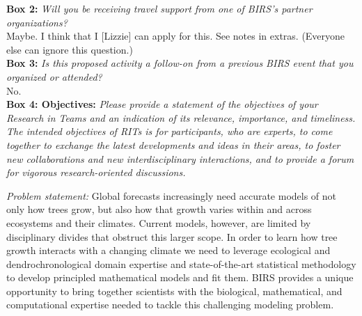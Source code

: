 \documentclass[11pt]{article}
\begin{document}
{\bf Box 2:} \emph{Will you be receiving travel support from one of BIRS's partner organizations?}\\
Maybe. I think that I [Lizzie] can apply for this. See notes in extras. (Everyone else can ignore this question.)\\

{\bf Box 3:} \emph{Is this proposed activity a follow-on from a previous BIRS event that you organized or attended?}\\
No. \\

{\bf Box 4: Objectives:} \emph{Please provide a statement of the objectives of your Research in Teams and an indication of its relevance, importance, and timeliness.} \emph{The intended objectives of RITs is for participants, who are experts, to come together to exchange the latest developments and ideas in their areas, to foster new collaborations and new interdisciplinary interactions, and to provide a forum for vigorous research-oriented discussions.}

\emph{Problem statement:} Global forecasts increasingly need accurate models of not only how trees grow, but also how that growth varies within and across ecosystems and their climates. Current models, however, are limited by disciplinary divides that obstruct this larger scope. In order to learn how tree growth interacts with a changing climate we need to leverage ecological and dendrochronological domain expertise and state-of-the-art statistical methodology to develop principled mathematical models and fit them. BIRS provides a unique opportunity to bring together scientists with the biological, mathematical, and computational expertise needed to tackle this challenging modeling problem.
\end{document}
